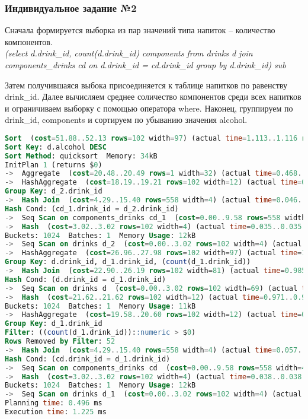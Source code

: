 \subsubsection{Индивидуальное задание №2}
Сначала формируется выборка из пар значений типа напиток -- количество компонентов.\\
\textit{(select d.drink\_id, count(d.drink\_id) components
	from drinks d
	join components\_drinks cd on d.drink\_id = cd.drink\_id
	group by d.drink\_id) sub}

Затем получившаяся выбока присоединяется к таблице напитков по равенству drink\_id.
Далее вычисляем среднее соличество компонентов среди всех напитков и ограничиваем выборку с помощью оператора where.
Наконец, группируем по drink\_id, components и сортируем по убыванию значения alcohol.



\begin{lstlisting}[language=SQL, caption={План запроса}]
Sort  (cost=51.88..52.13 rows=102 width=97) (actual time=1.113..1.116 rows=50 loops=1)
Sort Key: d.alcohol DESC
Sort Method: quicksort  Memory: 34kB
InitPlan 1 (returns $0)
->  Aggregate  (cost=20.48..20.49 rows=1 width=32) (actual time=0.468..0.468 rows=1 loops=1)
->  HashAggregate  (cost=18.19..19.21 rows=102 width=12) (actual time=0.427..0.446 rows=102 loops=1)
Group Key: d_2.drink_id
->  Hash Join  (cost=4.29..15.40 rows=558 width=4) (actual time=0.046..0.262 rows=558 loops=1)
Hash Cond: (cd_1.drink_id = d_2.drink_id)
->  Seq Scan on components_drinks cd_1  (cost=0.00..9.58 rows=558 width=4) (actual time=0.006..0.066 rows=558 loops=1)
->  Hash  (cost=3.02..3.02 rows=102 width=4) (actual time=0.035..0.035 rows=102 loops=1)
Buckets: 1024  Batches: 1  Memory Usage: 12kB
->  Seq Scan on drinks d_2  (cost=0.00..3.02 rows=102 width=4) (actual time=0.004..0.018 rows=102 loops=1)
->  HashAggregate  (cost=26.96..27.98 rows=102 width=97) (actual time=1.049..1.065 rows=50 loops=1)
Group Key: d.drink_id, d_1.drink_id, (count(d_1.drink_id))
->  Hash Join  (cost=22.90..26.19 rows=102 width=81) (actual time=0.985..1.023 rows=50 loops=1)
Hash Cond: (d.drink_id = d_1.drink_id)
->  Seq Scan on drinks d  (cost=0.00..3.02 rows=102 width=69) (actual time=0.007..0.017 rows=102 loops=1)
->  Hash  (cost=21.62..21.62 rows=102 width=12) (actual time=0.971..0.971 rows=50 loops=1)
Buckets: 1024  Batches: 1  Memory Usage: 11kB
->  HashAggregate  (cost=19.58..20.60 rows=102 width=12) (actual time=0.920..0.960 rows=50 loops=1)
Group Key: d_1.drink_id
Filter: ((count(d_1.drink_id))::numeric > $0)
Rows Removed by Filter: 52
->  Hash Join  (cost=4.29..15.40 rows=558 width=4) (actual time=0.057..0.267 rows=558 loops=1)
Hash Cond: (cd.drink_id = d_1.drink_id)
->  Seq Scan on components_drinks cd  (cost=0.00..9.58 rows=558 width=4) (actual time=0.015..0.075 rows=558 loops=1)
->  Hash  (cost=3.02..3.02 rows=102 width=4) (actual time=0.038..0.038 rows=102 loops=1)
Buckets: 1024  Batches: 1  Memory Usage: 12kB
->  Seq Scan on drinks d_1  (cost=0.00..3.02 rows=102 width=4) (actual time=0.004..0.019 rows=102 loops=1)
Planning time: 0.496 ms
Execution time: 1.225 ms
\end{lstlisting}

